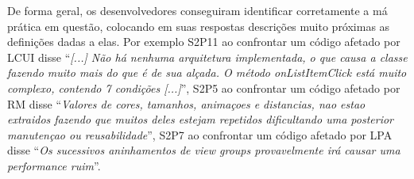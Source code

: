 De forma geral, os desenvolvedores conseguiram identificar corretamente a má prática em questão, colocando em suas respostas descrições muito próximas as definições dadas a elas. Por exemplo S2P11 ao confrontar um código afetado por \textsc{LCUI} disse ``\textit{[...] Não há nenhuma arquitetura implementada, o que causa a classe fazendo muito mais do que é de sua alçada. O método onListItemClick está muito complexo, contendo 7 condições [...]}'', S2P5 ao confrontar um código afetado por \textsc{RM} disse ``\textit{Valores de cores, tamanhos, animaçoes e distancias, nao estao extraidos fazendo que muitos deles estejam repetidos dificultando uma posterior manutençao ou reusabilidade}'', S2P7 ao confrontar um código afetado por \textsc{LPA} disse ``\textit{Os sucessivos aninhamentos de view groups provavelmente irá causar uma performance ruim}''.












